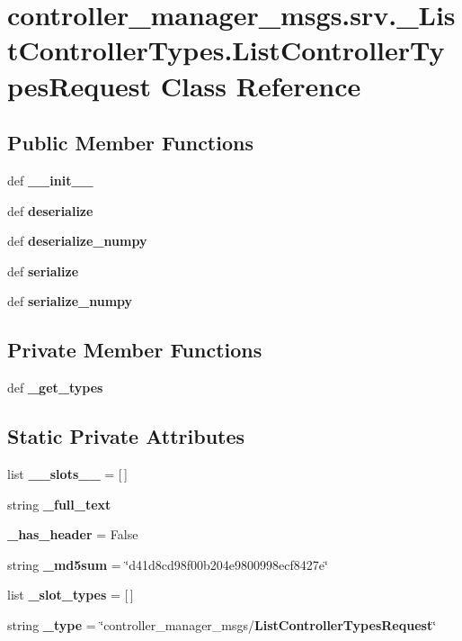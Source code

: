 \section{controller\-\_\-manager\-\_\-msgs.\-srv.\-\_\-\-List\-Controller\-Types.\-List\-Controller\-Types\-Request \-Class \-Reference}
\label{classcontroller__manager__msgs_1_1srv_1_1__ListControllerTypes_1_1ListControllerTypesRequest}
\subsection*{\-Public \-Member \-Functions}
\begin{DoxyCompactItemize}
\item 
def {\bf \-\_\-\-\_\-init\-\_\-\-\_\-}
\item 
def {\bf deserialize}
\item 
def {\bf deserialize\-\_\-numpy}
\item 
def {\bf serialize}
\item 
def {\bf serialize\-\_\-numpy}
\end{DoxyCompactItemize}
\subsection*{\-Private \-Member \-Functions}
\begin{DoxyCompactItemize}
\item 
def {\bf \-\_\-get\-\_\-types}
\end{DoxyCompactItemize}
\subsection*{\-Static \-Private \-Attributes}
\begin{DoxyCompactItemize}
\item 
list {\bf \-\_\-\-\_\-slots\-\_\-\-\_\-} = [$\,$]
\item 
string {\bf \-\_\-full\-\_\-text}
\item 
{\bf \-\_\-has\-\_\-header} = \-False
\item 
string {\bf \-\_\-md5sum} = \char`\"{}d41d8cd98f00b204e9800998ecf8427e\char`\"{}
\item 
list {\bf \-\_\-slot\-\_\-types} = [$\,$]
\item 
string {\bf \-\_\-type} = \char`\"{}controller\-\_\-manager\-\_\-msgs/{\bf \-List\-Controller\-Types\-Request}\char`\"{}
\end{DoxyCompactItemize}


